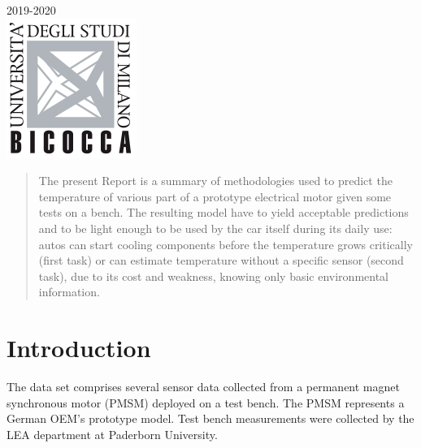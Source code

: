 \begin{titlepage}
{\large 2019-2020}\\[1cm] %


\includegraphics{imgs/logo.png}\\[1cm] %
 

\vfill %

\end{titlepage}


\begin{abstract}
  The present Report is a summary of methodologies used to predict the temperature of various part of a prototype electrical motor given some tests on a bench.
  The resulting model have to yield acceptable predictions and to be light enough to be used by the car itself during its daily use: autos can start cooling components before the temperature grows critically (first task) or can estimate temperature without a specific sensor (second task), due to its cost and weakness, knowing only basic environmental information.
\end{abstract}

\section{Introduction}
The data set comprises several sensor data collected from a permanent magnet synchronous motor (PMSM) deployed on a test bench.
The PMSM represents a German OEM's prototype model. 
Test bench measurements were collected by the LEA department at Paderborn University.


